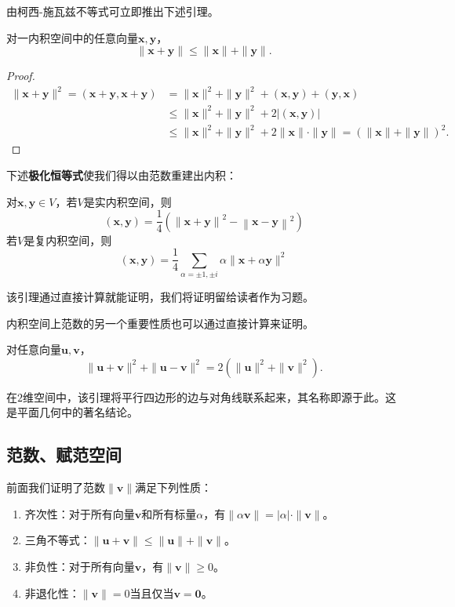 由柯西-施瓦兹不等式可立即推出下述引理。

\begin{lemma}[三角不等式]
    对一内积空间中的任意向量$\mathbf{x},\mathbf{y}$，
    \[\|\mathbf{x}+\mathbf{y}\|\leq\|\mathbf{x}\|+\|\mathbf{y}\|.\]
\end{lemma}
\begin{proof}
    \begin{align*}
        \|\mathbf{x}+\mathbf{y}\|^{2}=(\mathbf{x}+\mathbf{y},\mathbf{x}+\mathbf{y})&=\|\mathbf{x}\|^{2}+\|\mathbf{y}\|^{2}+(\mathbf{x},\mathbf{y})+(\mathbf{y},\mathbf{x})\\&\leq\|\mathbf{x}\|^{2}+\|\mathbf{y}\|^{2}+2|(\mathbf{x},\mathbf{y})|\\&\leq\|\mathbf{x}\|^2+\|\mathbf{y}\|^2+2\|\mathbf{x}\|\cdot\|\mathbf{y}\|=(\|\mathbf{x}\|+\|\mathbf{y}\|)^2.
    \end{align*}
\end{proof}
下述\textbf{极化恒等式}使我们得以由范数重建出内积：
\begin{lemma}[极化恒等式]\label{lem:polarization}
    对$\mathbf{x},\mathbf{y}\in V$，若$V$是实内积空间，则\[(\mathbf{x},\mathbf{y})=\frac{1}{4}\left(\left\|\mathbf{x}+\mathbf{y}\right\|^2-\left\|\mathbf{x}-\mathbf{y}\right\|^2\right)\]
    若$V$是复内积空间，则\[(\mathbf{x},\mathbf{y})=\frac{1}{4}\sum_{\alpha=\pm1,\pm i}\alpha\|\mathbf{x}+\alpha\mathbf{y}\|^2\]
\end{lemma}
该引理通过直接计算就能证明，我们将证明留给读者作为习题。

内积空间上范数的另一个重要性质也可以通过直接计算来证明。

\begin{lemma}[平行四边形恒等式]\label{lem:parallelogram}
    对任意向量$\mathbf{u},\mathbf{v}$，\[\|\mathbf{u}+\mathbf{v}\|^2+\|\mathbf{u}-\mathbf{v}\|^2=2(\|\mathbf{u}\|^2+\|\mathbf{v}\|^2).\]
\end{lemma}

在$2$维空间中，该引理将平行四边形的边与对角线联系起来，其名称即源于此。这是平面几何中的著名结论。

\subsection{范数、赋范空间}\label{subsec:normed_space}

前面我们证明了范数$\|\mathbf{v}\|$满足下列性质：
\begin{enumerate}
    \item 齐次性：对于所有向量$\mathbf{v}$和所有标量$\alpha$，有$\|\alpha\mathbf{v}\|=|\alpha|\cdot\|\mathbf{v}\|$。
    \item 三角不等式：$\|\mathbf{u}+\mathbf{v}\|\leq\|\mathbf{u}\|+\|\mathbf{v}\|$。
    \item 非负性：对于所有向量$\mathbf{v}$，有$\|\mathbf{v}\|\geq0$。
    \item 非退化性：$\|\mathbf{v}\|=0$当且仅当$\mathbf{v}=\mathbf{0}$。
\end{enumerate}

